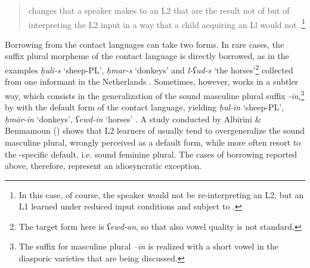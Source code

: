 \documentclass[output=paper]{langsci/langscibook}
\begin{document}
\begin{quote}changes that a speaker makes to an L2 that are the result not of  but of interpreting the L2 input in a way that a child acquiring an Ll would not \citep[525]{Lucas2015}.\footnote{In this case, of course, the speaker would not be re-interpreting an L2, but an L1 learned under reduced input conditions and subject to .}\end{quote}

Borrowing from the contact languages can take two forms. In rare cases, the suffix plural morpheme of the contact language is directly borrowed, as in the examples \textit{ḥuli-s} ‘sheep-PL’, \textit{ḥmar-s} ‘donkeys’ and \textit{l-ʕud-s} ‘the horses’\footnote{The target form here is \textit{ʕewd-an}, so that also vowel quality is not standard.} collected from one  informant in the Netherlands \citep[274]{BoumansdeRuiter2002}. Sometimes, however,  works in a subtler way, which consists in the generalization of the sound masculine plural suffix \textit{{}-īn},\footnote{The suffix for masculine plural \textit{–īn} is realized with a short vowel in the diasporic  varieties that are being discussed.} by  with the default form of the contact language, yielding \textit{ḥul-in} ‘sheep-PL’, \textit{ḥmār-in} ‘donkeys’, \textit{ʕewd-in} ‘horses’ \citep[274]{BoumansdeRuiter2002}. A study conducted by Albirini \& Benmamoun (\citeyear[866–867]{AlbiriniBenmamoun2014}) shows that L2 learners of  usually tend to overgeneralize the sound masculine plural, wrongly perceived as a default form, while  more often resort to the -specific default, i.e. sound feminine plural. The cases of borrowing reported above, therefore, represent an idiosyncratic exception.
\end{document}
